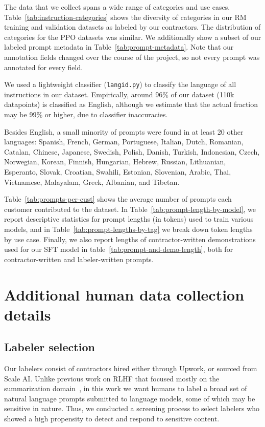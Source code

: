\documentclass{article}
\begin{document}
The data that we collect spans a wide range of categories and use cases. Table~\ref{tab:instruction-categories} shows the diversity of categories in our RM training and validation datasets as labeled by our contractors. The distribution of categories for the PPO datasets was similar.
We additionally show a subset of our labeled prompt metadata in Table~\ref{tab:prompt-metadata}. 
Note that our annotation fields changed over the course of the project, so not every prompt was annotated for every field.   

We used a lightweight classifier (\texttt{langid.py}) to classify the language of all instructions in our dataset.
Empirically, around 96\% of our dataset (110k datapoints) is classified as English, although we estimate that the actual fraction may be 99\% or higher, due to classifier inaccuracies.

Besides English, a small minority of prompts were found in at least 20 other languages:
Spanish, French, German, Portuguese, Italian, Dutch, Romanian, Catalan, Chinese, Japanese, Swedish, Polish, Danish, Turkish, Indonesian, Czech, Norwegian, Korean, Finnish, Hungarian, Hebrew, Russian, Lithuanian, Esperanto, Slovak, Croatian, Swahili, Estonian, Slovenian, Arabic, Thai, Vietnamese, Malayalam, Greek, Albanian, and Tibetan.

Table~\ref{tab:prompts-per-cust} shows the average number of prompts each customer contributed to the dataset. In Table~\ref{tab:prompt-length-by-model}, we report descriptive statistics for prompt lengths (in tokens) used to train various models, and in Table~\ref{tab:prompt-lengths-by-tag} we  break down token lengths by use case. Finally, we also report lengths of contractor-written demonstrations used for our SFT model in table~\ref{tab:prompt-and-demo-length}, both for contractor-written and labeler-written prompts.


\newpage
\section{Additional human data collection details}
\label{apdx:human-data}


\subsection{Labeler selection}
\label{apdx:human-data:selection}

Our labelers consist of contractors hired either through Upwork, or sourced from Scale AI. Unlike previous work on RLHF that focused mostly on the summarization domain~\cite{ziegler2019fine,stiennon2020learning,wu2021recursively}, in this work we want humans to label a broad set of natural language prompts submitted to language models, some of which may be sensitive in nature. Thus, we conducted a screening process to select labelers who showed a high propensity to detect and respond to sensitive content.
\end{document}
